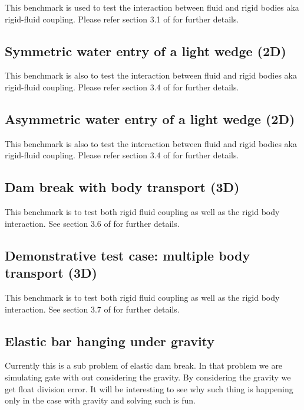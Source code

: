 \documentclass[preprint,12pt]{elsarticle}
\begin{document}
This benchmark is used to test the interaction between fluid and rigid bodies
aka rigid-fluid coupling. Please refer section 3.1 of \cite{dominguez2019sph}
for further details.

\subsection{Symmetric water entry of a light wedge (2D)}
\label{sec:Symmetric-water-entry}

This benchmark is also to test the interaction between fluid and rigid bodies
aka rigid-fluid coupling. Please refer section 3.4 of
\cite{amicarelli2015smoothed} for further details.


\subsection{Asymmetric water entry of a light wedge (2D)}
\label{sec:Asymmetric-water-entry}

This benchmark is also to test the interaction between fluid and rigid bodies
aka rigid-fluid coupling. Please refer section 3.4 of
\cite{amicarelli2015smoothed} for further details.


\subsection{Dam break with body transport (3D)}
\label{sec:dam-break-body}

This benchmark is to test both rigid fluid coupling as well as the rigid body
interaction. See section 3.6 of \cite{amicarelli2015smoothed} for further
details.


\subsection{Demonstrative test case: multiple body transport (3D)}
\label{sec:demonstrative-test-case}

This benchmark is to test both rigid fluid coupling as well as the rigid body
interaction. See section 3.7 of \cite{amicarelli2015smoothed} for further
details.


\subsection{Elastic bar hanging under gravity}
\label{sec:elastic-bar-hanging}


Currently this is a sub problem of elastic dam break. In that problem we are
simulating gate with out considering the gravity. By considering the gravity
we get float division error. It will be interesting to see why such thing is
happening only in the case with gravity and solving such is fun.
\end{document}
